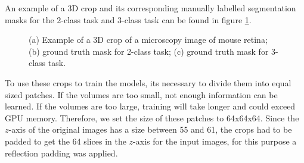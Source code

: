 An example of a 3D crop and its corresponding manually labelled segmentation masks for the 2-class task and 3-class task can be found in figure \ref{fig:dataset_original}.

\begin{figure}[!htb]
	\centering
	\hfil
  \hfil 
	\caption[(a) Example of a 3D crop of a microscopy image of mouse retina; (b) ground truth mask for 2-class task; (c) ground truth mask for 3-class task.]{(a) Example of a 3D crop of a microscopy image of mouse retina; (b) ground truth mask for 2-class task; (c) ground truth mask for 3-class task.}
	\label{fig:dataset_original}
\end{figure}

To use these crops to train the models, its necessary to divide them into equal sized patches. If the volumes are too small, not enough information can be learned. If the volumes are too large, training will take longer and could exceed GPU memory. Therefore, we set the size of these patches to 64x64x64. Since the $z$-axis of the original images has a size between 55 and 61, the crops had to be padded to get the 64 slices in the $z$-axis for the input images, for this purpose a reflection padding was applied.

